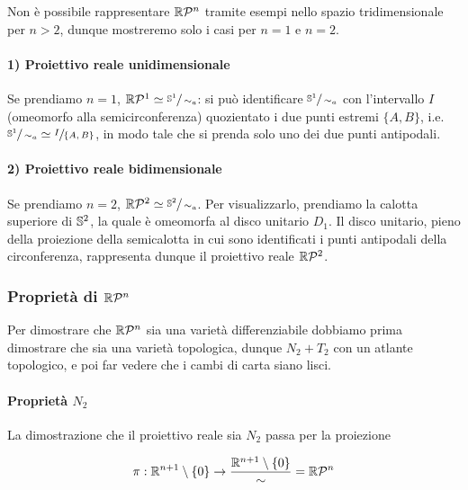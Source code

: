 Non è possibile rappresentare $ \rp{n} $ tramite esempi nello spazio tridimensionale per $ n > 2 $, dunque mostreremo solo i casi per $ n = 1 $ e  $ n = 2 $.

\paragraph{1) Proiettivo reale unidimensionale}

Se prendiamo $ n = 1 $, $ \rp{1} \simeq \sfrac{\S^{1}}{\sim_{a}} $: si può identificare $ \sfrac{\S^{1}}{\sim_{a}} $ con l'intervallo $ I $ (omeomorfo alla semicirconferenza) quozientato i due punti estremi $ \{A,B\} $, i.e. $ \sfrac{\S^{1}}{\sim_{a}} \simeq \sfrac{I}{\{A,B\}} $, in modo tale che si prenda solo uno dei due punti antipodali.

\paragraph{2) Proiettivo reale bidimensionale}

Se prendiamo $ n = 2 $, $ \rp{2} \simeq \sfrac{\S^{2}}{\sim_{a}} $. Per visualizzarlo, prendiamo la calotta superiore di $ \S^{2} $, la quale è omeomorfa al disco unitario $ D_{1} $. Il disco unitario, pieno della proiezione della semicalotta in cui sono identificati i punti antipodali della circonferenza, rappresenta dunque il proiettivo reale $ \rp{2} $.

\subsubsection{Proprietà di $ \rp{n} $}

Per dimostrare che $ \rp{n} $ sia una varietà differenziabile dobbiamo prima dimostrare che sia una varietà topologica, dunque $ N_{2}+T_{2} $ con un atlante topologico, e poi far vedere che i cambi di carta siano lisci.

\paragraph{Proprietà $ N_{2} $}

La dimostrazione che il proiettivo reale sia $ N_{2} $ passa per la proiezione

\begin{equation}
	\pi : \R^{n+1} \setminus \{0\} \to \dfrac{\R^{n+1} \setminus \{0\}}{\sim} = \rp{n}
\end{equation}

